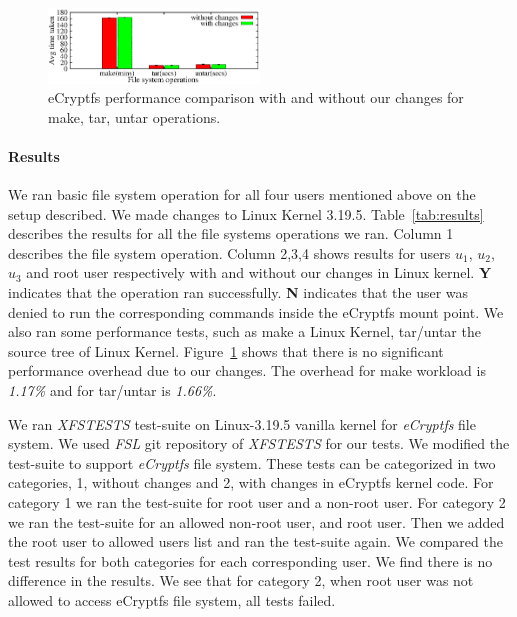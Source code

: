 \begin{figure}[t]
    \centering
    \includegraphics[width=0.5\textwidth]{figures/perf-results.eps}
    \caption{eCryptfs performance comparison with and without our
    changes for make, tar, untar operations.}
    \label{fig:perf-results}
\end{figure}


\paragraph{Results}
We ran basic file system operation for all four users mentioned above
on the setup described.  We made changes to Linux Kernel 3.19.5.
Table~\ref{tab:results} describes the results for all the file systems
operations we ran.  Column 1 describes the file system operation.
Column 2,3,4 shows results for users $u_1$, $u_2$, $u_3$ and root user
respectively with and without our changes in Linux kernel.  \textbf{Y}
indicates that the  operation ran successfully.  \textbf{N} indicates
that the user was denied to run the corresponding commands inside the
eCryptfs mount point.  We also ran some performance tests, such as
make a Linux Kernel, tar/untar the source tree of Linux Kernel.
Figure~\ref{fig:perf-results} shows that there is no significant
performance overhead due to our changes.  The overhead for make workload
is \emph{1.17\%} and for tar/untar is \emph{1.66\%}.

We ran \emph{XFSTESTS} test-suite on Linux-3.19.5 vanilla kernel for
\emph{eCryptfs} file system.  We used \emph{FSL} git repository of
\emph{XFSTESTS} for our tests.  We modified the test-suite to support
\emph{eCryptfs} file system.  These tests can be categorized in two
categories, 1, without changes and 2, with changes in eCryptfs kernel
code.  For category 1 we ran the test-suite for root user and a
non-root user.  For category 2 we ran the test-suite for an allowed
non-root user, and root user.  Then we added the root user to allowed
users list and ran the test-suite again.  We compared the test results
for both categories for each corresponding user.  We find there is no
difference in the results.  We see that for category 2, when root user
was not allowed to access eCryptfs file system, all tests failed.

